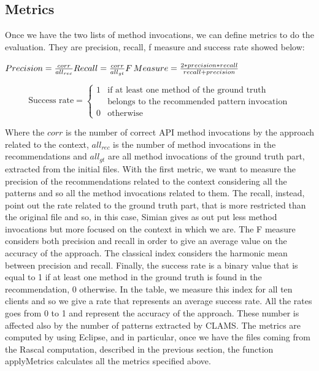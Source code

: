 \subsection{Metrics}
Once we have the two lists of method invocations, we can define metrics to do the evaluation. They are precision, recall,  f measure and success rate showed below:\\


\begingroup

\fontsize{15pt}{24pt}\selectfont
\noindent
$ Precision =  \frac{corr}{all_{rec}}\\  
\\
Recall  = \frac{corr}{all_{gt}} \\  
\\
F\,Measure =\frac{2*precision*recall}{recall+precision}\\
$

\begin{equation}
 \text{Success rate} =
    \begin{cases}
      1 & \text{if at least one method of the ground truth }\\
      & \text{belongs to the recommended pattern invocation}\\      
      0 & \text{otherwise}
    \end{cases}       
\end{equation}

\endgroup



Where the $corr$ is the number of correct API method invocations by the approach related to the context, $all_{rec}$ is the number of method invocations in the recommendations and $all_{gt}$ are all method invocations of the ground truth part, extracted from the initial files. With the first metric, we want to measure the precision of the recommendations related to the context considering all the patterns and so all the method invocations related to them. The recall, instead, point out the rate related to the ground truth part, that is more restricted than the original file and so, in this case, Simian gives as out put less method invocations but more focused on the context in which we are. The F measure considers both precision and recall in order to give an average value on the accuracy of the approach. The classical index considers the harmonic mean between precision and recall. Finally, the success rate is a binary value that is equal to 1 if at least one method in the ground truth is found in the recommendation, 0 otherwise. In the table, we measure this index for all ten clients and so we give a rate that represents an average success rate.
All the rates goes from 0 to 1 and represent the accuracy of the approach. These number is affected also by the number of patterns extracted by CLAMS. The metrics are computed by using Eclipse, and in particular, once we have the files coming from the Rascal computation, described in the previous section, the function applyMetrics calculates all the metrics specified above.

